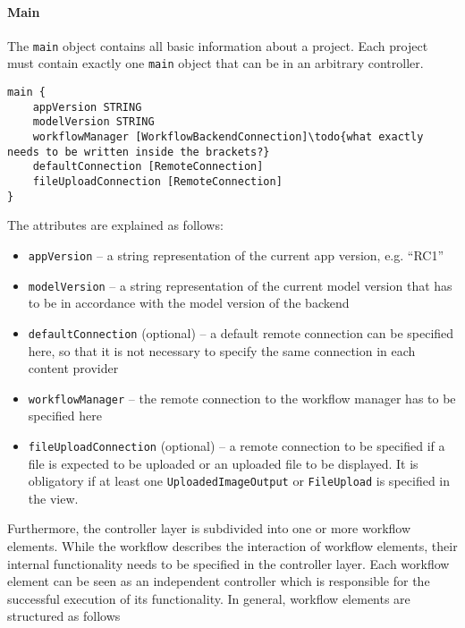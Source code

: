 
\paragraph{Main}
The \lstinline!main! object contains all basic information about a project. Each project must contain exactly one \lstinline!main! object that can be in an arbitrary controller.

\begin{lstlisting}
main {
	appVersion STRING
	modelVersion STRING
	workflowManager [WorkflowBackendConnection]\todo{what exactly needs to be written inside the brackets?}
	defaultConnection [RemoteConnection]
	fileUploadConnection [RemoteConnection]
}
\end{lstlisting}

The attributes are explained as follows:
\begin{itemize}
\item \lstinline!appVersion! -- a string representation of the current app version, e.g. \enquote{RC1}
\item  \lstinline!modelVersion! -- a string representation of the current model version that has to be in accordance with the model version of the backend
\item  \lstinline!defaultConnection! (optional) -- a default remote connection can be specified here, so that it is not necessary to specify the same connection in each content provider
\item \lstinline!workflowManager! -- the remote connection to the workflow manager has to be specified here 
\item \lstinline!fileUploadConnection! (optional) -- a remote connection to be specified if a file is expected to be uploaded or an uploaded file to be displayed. It is obligatory if at least one \lstinline!UploadedImageOutput! or \lstinline!FileUpload! is specified in the view.
\end{itemize}

Furthermore, the controller layer is subdivided into one or more workflow elements. While the workflow describes the interaction of workflow elements, their internal functionality needs to be specified in the controller layer. Each workflow element can be seen as an independent controller which is responsible for the successful execution of its functionality. In general, workflow elements are structured as follows

